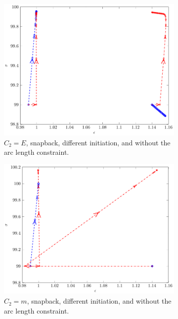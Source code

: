 \documentclass[11pt]{elsarticle}
\begin{document}
\begin{figure}
\begin{subfigure}{0.45\textwidth}
		\centering
		\includegraphics[scale=0.7]{./conv_figs/bad_metric_snap_no_arclength_add.pdf}
		\caption{$C_2=E$, snapback, different initiation, and without the arc length constraint.}
		\label{bad_metric_snap_no_arclength_add}
	\end{subfigure}
	\hfill
	\begin{subfigure}{0.45\textwidth}
		\centering
		\includegraphics[scale=0.7]{./conv_figs/good_metric_snap_no_arclength_add.pdf}
		\caption{$C_2=m$, snapback, different initiation, and without the arc length constraint.}
		\label{good_metric_snap_no_arclength_add}
	\end{subfigure}
\centering
	\begin{subfigure}{0.45\textwidth}

\end{subfigure}
\end{figure}
\end{document}
